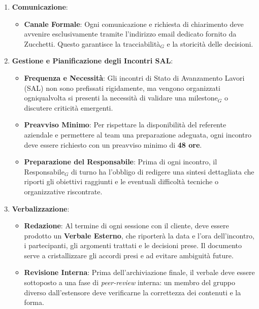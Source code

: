 \documentclass[a4paper, 10pt]{article}
\begin{document}
\begin{enumerate}
    \item \textbf{Comunicazione}:
    \begin{itemize}
        \item \textbf{Canale Formale}: Ogni comunicazione e richiesta di chiarimento deve avvenire esclusivamente tramite l'indirizzo email dedicato fornito da Zucchetti. Questo garantisce la tracciabilità$_G$ e la storicità delle decisioni.
    \end{itemize}
    
    \item \textbf{Gestione e Pianificazione degli Incontri SAL}:
    \begin{itemize}
        \item \textbf{Frequenza e Necessità}: Gli incontri di Stato di Avanzamento Lavori (SAL) non sono prefissati rigidamente, ma vengono organizzati ogniqualvolta si presenti la necessità di validare una milestone$_G$ o discutere criticità emergenti.
        \item \textbf{Preavviso Minimo}: Per rispettare la disponibilità del referente aziendale e permettere al team una preparazione adeguata, ogni incontro deve essere richiesto con un preavviso minimo di \textbf{48 ore}.
        \item \textbf{Preparazione del Responsabile}: Prima di ogni incontro, il Responsabile$_G$ di turno ha l'obbligo di redigere una sintesi dettagliata che riporti gli obiettivi raggiunti e le eventuali difficoltà tecniche o organizzative riscontrate.
    \end{itemize}

    \item \textbf{Verbalizzazione}:
    \begin{itemize}
        \item \textbf{Redazione}: Al termine di ogni sessione con il cliente, deve essere prodotto un \textbf{Verbale Esterno}, che riporterà la data e l'ora dell'incontro, i partecipanti, gli argomenti trattati e le decisioni prese.
        Il documento serve a cristallizzare gli accordi presi e ad evitare ambiguità future.
        \item \textbf{Revisione Interna}: Prima dell'archiviazione finale, il verbale deve essere sottoposto a una fase di \textit{peer-review} interna: un membro del gruppo diverso dall'estensore deve verificarne la correttezza dei contenuti e la forma.
    \end{itemize}
\end{enumerate}
\end{document}

